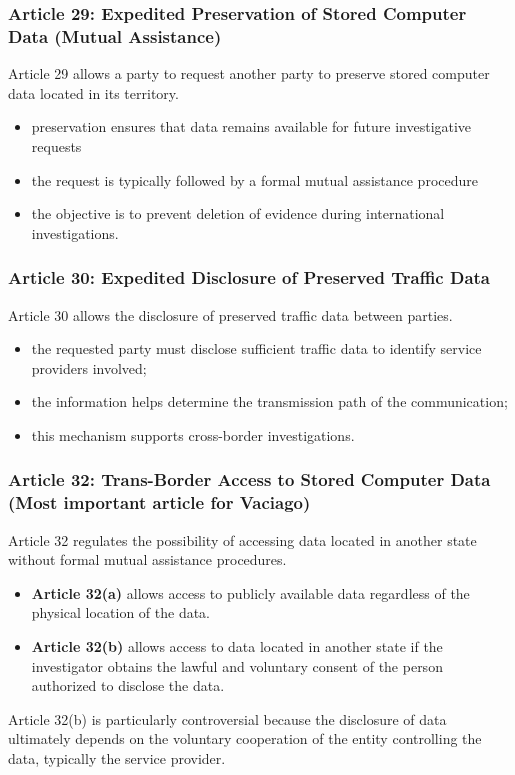 \subsubsection*{Article 29: Expedited Preservation of Stored Computer Data (Mutual Assistance)}

Article 29 allows a party to request another party to preserve stored computer data located in its territory.

\begin{itemize}
\item preservation ensures that data remains available for future investigative requests
\item the request is typically followed by a formal mutual assistance procedure
\item the objective is to prevent deletion of evidence during international investigations.
\end{itemize}



\subsubsection*{Article 30: Expedited Disclosure of Preserved Traffic Data}

Article 30 allows the disclosure of preserved traffic data between parties.

\begin{itemize}
\item the requested party must disclose sufficient traffic data to identify service providers involved;
\item the information helps determine the transmission path of the communication;
\item this mechanism supports cross-border investigations.
\end{itemize}



\subsubsection*{Article 32: Trans-Border Access to Stored Computer Data (Most important article for Vaciago)}

Article 32 regulates the possibility of accessing data located in another state without formal mutual assistance procedures.

\begin{itemize}
\item \textbf{Article 32(a)} allows access to publicly available data regardless of the physical location of the data.

\item \textbf{Article 32(b)} allows access to data located in another state if the investigator obtains the lawful and voluntary consent of the person authorized to disclose the data.
\end{itemize}

\noindent
Article 32(b) is particularly controversial because the disclosure of data ultimately depends on the voluntary cooperation of the entity controlling the data, typically the service provider.